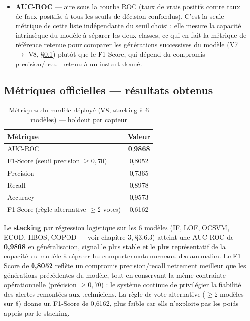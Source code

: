 \documentclass[12pt,a4paper]{report}
\begin{document}
\begin{itemize}
    « normal » afficherait déjà une accuracy élevée sans détecter aucune anomalie ;
  \item \textbf{AUC-ROC} \cite{fawcett2006} — aire sous la courbe ROC (taux de vrais positifs contre taux de
    faux positifs, à tous les seuils de décision confondus). C'est la seule métrique de
    cette liste indépendante du seuil choisi : elle mesure la capacité intrinsèque du
    modèle à séparer les deux classes, ce qui en fait la métrique de référence retenue
    pour comparer les générations successives du modèle (V7 $\to$ V8,
    \S\ref{subsec:metriques_officielles}) plutôt que le F1-Score, qui dépend du compromis
    precision/recall retenu à un instant donné.
\end{itemize}


\subsection{Métriques officielles — résultats obtenus}
\label{subsec:metriques_officielles}

\begin{table}[H]
\centering
\caption{Métriques du modèle déployé (V8, stacking à 6 modèles) — holdout par capteur}
\label{tab:metriques_eval}
\begin{tabular}{lc}
\toprule
\textbf{Métrique} & \textbf{Valeur} \\
\midrule
AUC-ROC   & \textbf{0,9868} \\
F1-Score (seuil precision $\geq 0{,}70$) & 0,8052 \\
Precision & 0,7365 \\
Recall    & 0,8978 \\
Accuracy  & 0,9573 \\
F1-Score (règle alternative $\geq 2$ votes) & 0,6162 \\
\bottomrule
\end{tabular}
\end{table}

Le \textbf{stacking} par régression logistique sur les 6 modèles (IF, LOF, OCSVM, ECOD,
HBOS, COPOD — voir chapitre 3, §3.6.3) atteint une AUC-ROC de \textbf{0,9868} en
généralisation, signal le plus stable et le plus représentatif de la capacité du modèle à
séparer les comportements normaux des anomalies. Le F1-Score de \textbf{0,8052} reflète un
compromis precision/recall nettement meilleur que les générations précédentes du modèle,
tout en conservant la même contrainte opérationnelle (précision $\geq 0{,}70$) : le système
continue de privilégier la fiabilité des alertes remontées aux techniciens. La règle de
vote alternative ($\geq 2$ modèles sur 6) donne un F1-Score de 0,6162, plus faible car elle
n'exploite pas les poids appris par le stacking.
\end{document}
